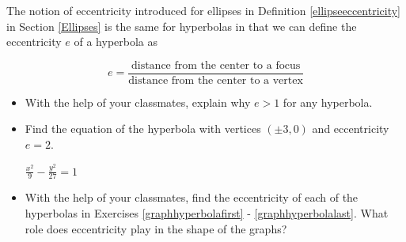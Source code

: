 \documentclass{ximera}
\begin{document}
\begin{problem}\label{hyperbolaeccentricity} 
    
The notion of eccentricity introduced for ellipses in Definition \ref{ellipseeccentricity} in Section \ref{Ellipses} is the same for hyperbolas in that we can define the eccentricity $e$ of a hyperbola as 

\[  e = \frac{\mbox{distance from the center to a focus}}{\mbox{distance from the center to a vertex}} \]

\begin{itemize}
    \item 
    With the help of your classmates, explain why $e > 1$ for any hyperbola.


\item 
     Find the equation of the hyperbola with vertices $(\pm 3,0)$ and eccentricity $e = 2$.

\begin{solution}
$\frac{x^2}{9} - \frac{y^2}{27} = 1$
\end{solution}

\item 
     With the help of your classmates, find the eccentricity of each of the hyperbolas in  Exercises \ref{graphhyperbolafirst} - \ref{graphhyperbolalast}.  What role does eccentricity play in the shape of the graphs?

\end{itemize}
    
\end{problem}
\end{document}

